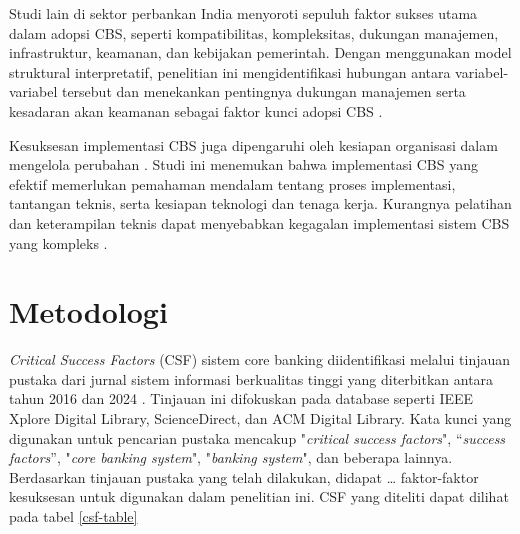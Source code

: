 \documentclass[journal,article,submit,pdftex,moreauthors]{Definitions/mdpi}
\begin{document}
Studi lain \cite{salu-csf} di sektor perbankan India menyoroti sepuluh faktor sukses utama dalam adopsi CBS, seperti kompatibilitas, kompleksitas, dukungan manajemen, infrastruktur, keamanan, dan kebijakan pemerintah. Dengan menggunakan model struktural interpretatif, penelitian ini mengidentifikasi hubungan antara variabel-variabel tersebut dan menekankan pentingnya dukungan manajemen serta kesadaran akan keamanan sebagai faktor kunci adopsi CBS \cite{salu-csf}.

Kesuksesan implementasi CBS juga dipengaruhi oleh kesiapan organisasi dalam mengelola perubahan \cite{johny-csf}. Studi ini menemukan bahwa implementasi CBS yang efektif memerlukan pemahaman mendalam tentang proses implementasi, tantangan teknis, serta kesiapan teknologi dan tenaga kerja. Kurangnya pelatihan dan keterampilan teknis dapat menyebabkan kegagalan implementasi sistem CBS yang kompleks \cite{johny-csf}.




\section{Metodologi}





\textit{Critical Success Factors} (CSF) sistem core banking diidentifikasi melalui tinjauan pustaka dari jurnal sistem informasi berkualitas tinggi yang diterbitkan antara tahun 2016 dan 2024 \cite{Ghafari-csf} \cite{falisat-csf} \cite{salu-csf} \cite{johny-csf}. Tinjauan ini difokuskan pada database seperti IEEE Xplore Digital Library, ScienceDirect, dan ACM Digital Library. Kata kunci yang digunakan untuk pencarian pustaka mencakup "\textit{critical success factors}", “\textit{success factors}”, "\textit{core banking system}", "\textit{banking system}", dan beberapa lainnya. Berdasarkan tinjauan pustaka yang telah dilakukan, didapat … faktor-faktor kesuksesan untuk digunakan dalam penelitian ini. CSF yang diteliti dapat dilihat pada tabel \ref{csf-table}
\end{document}

